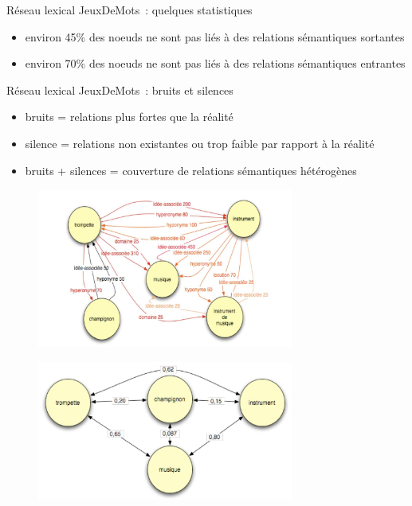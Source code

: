 \documentclass{beamer}
\begin{document}
\begin{frame}
  Réseau lexical JeuxDeMots~: quelques statistiques
  \begin{itemize}
  \item environ 45\% des noeuds ne sont pas liés à des relations sémantiques sortantes
  \item environ 70\% des noeuds ne sont pas liés à des relations sémantiques entrantes
  \end{itemize}
\end{frame}

\begin{frame}
  Réseau lexical JeuxDeMots~: bruits et silences
  \begin{itemize}
  \item bruits = relations plus fortes que la réalité 
  \item silence = relations non existantes ou trop faible par rapport à la réalité 
  \item bruits + silences = couverture de relations sémantiques hétérogènes
  \end{itemize}
\end{frame}


\begin{frame}
\begin{figure}
 \begin{minipage}{\textwidth}
\centering 
       \includegraphics[width=0.75\textwidth]{img/jdm.jpeg}
    \end{minipage}
\end{figure}
\end{frame}


\begin{frame}
\begin{figure}
 \begin{minipage}{\textwidth}
\centering 
       \includegraphics[width=0.75\textwidth]{img/lsa.jpeg}
  \end{minipage}
\end{figure}
\end{frame}
\end{document}
